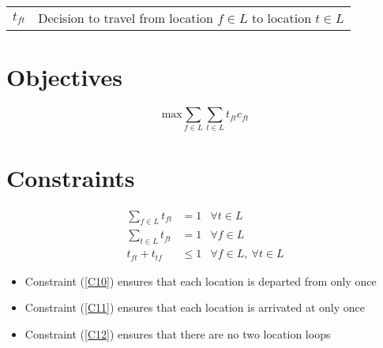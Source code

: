 \documentclass[a4paper]{article}
\begin{document}
\begin{tabular}{rl}
    $t_{ft}$ & Decision to travel from location $f \in L$ to location $t \in L$
\end{tabular}

\section*{Objectives}

\[
\text{max} \sum_{f \in L} \sum_{t \in L} t_{ft} c_{ft}
\]

\section*{Constraints}

\begin{align}
\sum_{f \in L} t_{ft} & = 1 & \forall t \in L \label{C10}\\
\sum_{t \in L} t_{ft} & = 1 & \forall f \in L \label{C11}\\
t_{ft} +  t_{tf} & \leq 1 & \forall f \in L,\ \forall t \in L \label{C12}
\end{align}

\begin{itemize}
    \item Constraint (\ref{C10}) ensures that each location is departed from only once
    \item Constraint (\ref{C11}) ensures that each location is arrivated at only once
    \item Constraint (\ref{C12}) ensures that there are no two location loops
\end{itemize}
\end{document}
